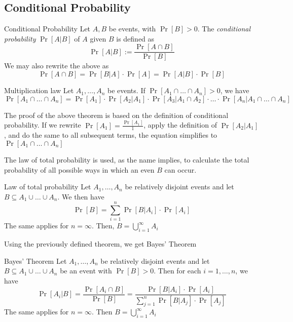 \newpage
\subsection{Conditional Probability}
\setcounter{all}{8}
\begin{definition}[]{Conditional Probability}
    Let $A, B$ be events, with $\Pr[B] > 0$. The \textit{conditional probability} $\Pr[A|B]$ of $A$ given $B$ is defined as
    \[
        \Pr[A|B] := \frac{\Pr[A \cap B]}{\Pr[B]}
    \]
    We may also rewrite the above as
    \[
        \Pr[A \cap B] = \Pr[B|A] \cdot \Pr[A] = \Pr[A|B] \cdot \Pr[B]
    \]
\end{definition}

\setcounter{all}{10}
\begin{theorem}[]{Multiplication law}
    Let $A_1, \ldots, A_n$ be events. If $\Pr[A_1 \cap \ldots \cap A_n] > 0$, we have
    \[
        \Pr[A_1 \cap \ldots \cap A_n] = \Pr[A_1] \cdot \Pr[A_2|A_1] \cdot \Pr[A_3|A_1 \cap A_2] \cdot \ldots \cdot \Pr[A_n|A_1 \cap \ldots \cap A_n]
    \]
\end{theorem}

The proof of the above theorem is based on the definition of conditional probability. If we rewrite $\Pr[A_1] = \frac{\Pr[A_1]}{1}$, apply the definition of $\Pr[A_2 | A_1]$, and do the same to all subsequent terms, the equation simplifies to $\Pr[A_1 \cap \ldots \cap A_n]$


 The law of total probability is used, as the name implies, to calculate the total probability of all possible ways in which an even $B$ can occur.
\setcounter{all}{13}
\begin{theorem}[]{Law of total probability}
    Let $A_1, \ldots, A_n$ be relatively disjoint events and let $B \subseteq A_1 \cup \ldots \cup A_n$. We then have
    \[
        \Pr[B] = \sum_{i = 1}^{n} \Pr[B|A_i] \cdot \Pr[A_i]
    \]
    The same applies for $n = \infty$. Then, $B = \bigcup_{i = 1}^{\infty} A_i$
\end{theorem}

Using the previously defined theorem, we get Bayes' Theorem

\setcounter{all}{15}
\begin{theorem}[]{Bayes' Theorem}
    Let $A_1, \ldots, A_n$ be relatively disjoint events and let $B \subseteq A_1 \cup \ldots \cup A_n$ be an event with $\Pr[B] > 0$. Then for each $i = 1, \ldots, n$, we have
    \[
        \Pr[A_i|B] = \frac{\Pr[A_i \cap B]}{\Pr[B]} = \frac{\Pr[B|A_i] \cdot \Pr[A_i]}{\sum_{j = 1}^{n} \Pr[B|A_j] \cdot \Pr[A_j]}
    \]
    The same applies for $n = \infty$. Then $B = \bigcup_{i = 1}^{\infty} A_i$
\end{theorem}

